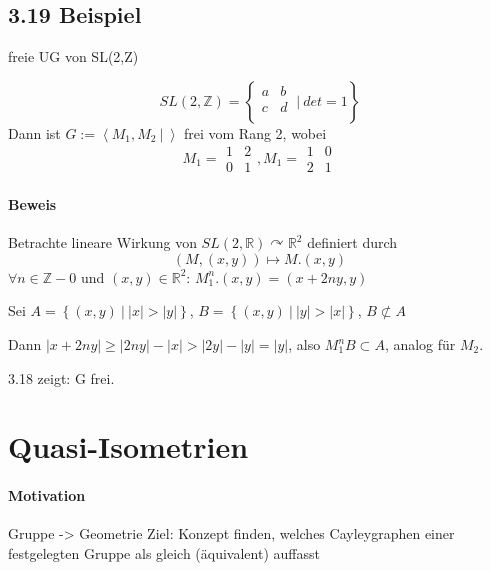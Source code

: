 \documentclass{article}
\newcommand{\Z}{\mathbb{Z}}
\newcommand{\R}{\mathbb{R}}
\newcommand{\set}[2]{\left\lbrace #1~|~#2 \right\rbrace}
\newcommand{\grp}[2]{\left\langle #1~|~#2 \right\rangle}
\begin{document}
\subsection{3.19 Beispiel}
freie UG von SL(2,Z)

\[SL(2,\Z) = \set{\begin{matrix}
	a & b\\
	c & d\\
	\end{matrix}}{det = 1}\]
Dann ist $G:= \grp{M_1, M_2}{}$ frei vom Rang 2, wobei 
\[M_1 =\begin{matrix}
1 & 2\\
0 & 1
\end{matrix}, M_1 =\begin{matrix}
1 & 0\\
2 & 1
\end{matrix}\]

\paragraph{Beweis}
Betrachte lineare Wirkung von $SL(2,\R) \curvearrowright \R^2$ definiert durch
\[(M, (x,y)) \longmapsto M.(x,y)\]
$\forall n \in \Z - 0$ und $(x,y) \in \R^2$: $M_1^n.(x,y) = (x+2ny,y)$

Sei $A = \set{(x,y)}{|x| > |y|}$, 
 $B = \set{(x,y)}{|y| > |x|}$,  $B \not \subset A$

Dann $|x + 2ny| \geq |2ny| - |x| > |2y| - |y| = |y|$, also $M_1^nB \subset A$, analog für $M_2$.

3.18 zeigt: G frei.


\newpage
\section{Quasi-Isometrien}

\paragraph{Motivation}
Gruppe -> Geometrie
Ziel: Konzept finden, welches Cayleygraphen einer festgelegten Gruppe als gleich (äquivalent) auffasst
\end{document}
